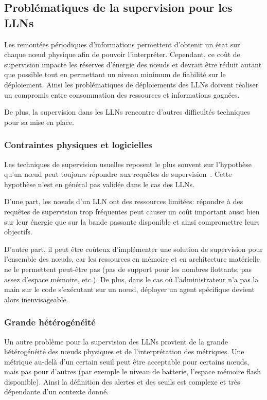 \subsection{Problématiques de la supervision pour les \ac{LLN}s}

Les remontées périodiques d'informations permettent d'obtenir un état sur chaque nœud physique afin de pouvoir l'interpréter. 
Cependant, ce coût de supervision impacte les réserves d'énergie des nœuds et devrait être réduit autant que possible tout en permettant un niveau minimum de fiabilité sur le déploiement.
Ainsi les problématiques de déploiements des \ac{LLN}s doivent réaliser un compromis entre consommation des ressources et informations gagnées.

De plus, la supervision dans les \ac{LLN}s rencontre d'autres difficultés techniques pour sa mise en place.

\subsubsection{Contraintes physiques et logicielles}

Les techniques de supervision usuelles reposent le plus souvent sur l'hypothèse qu'un nœud peut toujours répondre aux requêtes de supervision~\cite{ward2014observing}.
Cette hypothèse n'est en général pas validée dans le cas des \ac{LLN}s.

D'une part, les nœuds d'un \ac{LLN} ont des ressources limitées: répondre à des requêtes de supervision trop fréquentes peut causer un coût important aussi bien sur leur énergie que sur la bande passante disponible et ainsi compromettre leurs objectifs.

D'autre part, il peut être coûteux d'implémenter une solution de supervision pour l'ensemble des nœuds, car les ressources en mémoire et en architecture matérielle ne le permettent peut-être pas (pas de support pour les nombres flottants, pas assez d'espace mémoire, etc.).
De plus, dans le cas où l'administrateur n'a pas la main sur le code s'exécutant sur un nœud, déployer un agent spécifique devient alors inenvisageable.

\subsubsection{Grande hétérogénéité}

Un autre problème pour la supervision des \ac{LLN}s provient de la grande hétérogénéité des nœuds physiques et de l'interprétation des métriques.
Une métrique au-delà d'un certain seuil peut être acceptable pour certains nœuds, mais pas pour d'autres (par exemple le niveau de batterie, l'espace mémoire flash disponible).
Ainsi la définition des alertes et des seuils est complexe et très dépendante d'un contexte donné.

